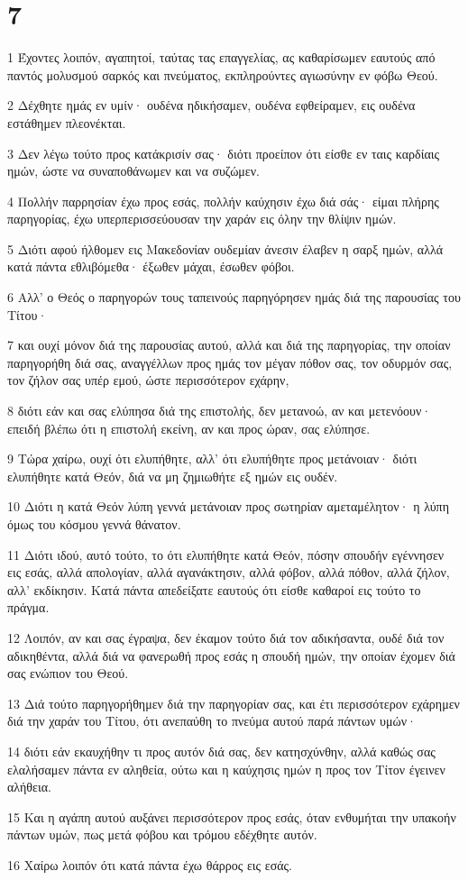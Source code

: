 \chapter{7}

\par 1 Έχοντες λοιπόν, αγαπητοί, ταύτας τας επαγγελίας, ας καθαρίσωμεν εαυτούς από παντός μολυσμού σαρκός και πνεύματος, εκπληρούντες αγιωσύνην εν φόβω Θεού.
\par 2 Δέχθητε ημάς εν υμίν· ουδένα ηδικήσαμεν, ουδένα εφθείραμεν, εις ουδένα εστάθημεν πλεονέκται.
\par 3 Δεν λέγω τούτο προς κατάκρισίν σας· διότι προείπον ότι είσθε εν ταις καρδίαις ημών, ώστε να συναποθάνωμεν και να συζώμεν.
\par 4 Πολλήν παρρησίαν έχω προς εσάς, πολλήν καύχησιν έχω διά σάς· είμαι πλήρης παρηγορίας, έχω υπερπερισσεύουσαν την χαράν εις όλην την θλίψιν ημών.
\par 5 Διότι αφού ήλθομεν εις Μακεδονίαν ουδεμίαν άνεσιν έλαβεν η σαρξ ημών, αλλά κατά πάντα εθλιβόμεθα· έξωθεν μάχαι, έσωθεν φόβοι.
\par 6 Αλλ' ο Θεός ο παρηγορών τους ταπεινούς παρηγόρησεν ημάς διά της παρουσίας του Τίτου·
\par 7 και ουχί μόνον διά της παρουσίας αυτού, αλλά και διά της παρηγορίας, την οποίαν παρηγορήθη διά σας, αναγγέλλων προς ημάς τον μέγαν πόθον σας, τον οδυρμόν σας, τον ζήλον σας υπέρ εμού, ώστε περισσότερον εχάρην,
\par 8 διότι εάν και σας ελύπησα διά της επιστολής, δεν μετανοώ, αν και μετενόουν· επειδή βλέπω ότι η επιστολή εκείνη, αν και προς ώραν, σας ελύπησε.
\par 9 Τώρα χαίρω, ουχί ότι ελυπήθητε, αλλ' ότι ελυπήθητε προς μετάνοιαν· διότι ελυπήθητε κατά Θεόν, διά να μη ζημιωθήτε εξ ημών εις ουδέν.
\par 10 Διότι η κατά Θεόν λύπη γεννά μετάνοιαν προς σωτηρίαν αμεταμέλητον· η λύπη όμως του κόσμου γεννά θάνατον.
\par 11 Διότι ιδού, αυτό τούτο, το ότι ελυπήθητε κατά Θεόν, πόσην σπουδήν εγέννησεν εις εσάς, αλλά απολογίαν, αλλά αγανάκτησιν, αλλά φόβον, αλλά πόθον, αλλά ζήλον, αλλ' εκδίκησιν. Κατά πάντα απεδείξατε εαυτούς ότι είσθε καθαροί εις τούτο το πράγμα.
\par 12 Λοιπόν, αν και σας έγραψα, δεν έκαμον τούτο διά τον αδικήσαντα, ουδέ διά τον αδικηθέντα, αλλά διά να φανερωθή προς εσάς η σπουδή ημών, την οποίαν έχομεν διά σας ενώπιον του Θεού.
\par 13 Διά τούτο παρηγορήθημεν διά την παρηγορίαν σας, και έτι περισσότερον εχάρημεν διά την χαράν του Τίτου, ότι ανεπαύθη το πνεύμα αυτού παρά πάντων υμών·
\par 14 διότι εάν εκαυχήθην τι προς αυτόν διά σας, δεν κατησχύνθην, αλλά καθώς σας ελαλήσαμεν πάντα εν αληθεία, ούτω και η καύχησις ημών η προς τον Τίτον έγεινεν αλήθεια.
\par 15 Και η αγάπη αυτού αυξάνει περισσότερον προς εσάς, όταν ενθυμήται την υπακοήν πάντων υμών, πως μετά φόβου και τρόμου εδέχθητε αυτόν.
\par 16 Χαίρω λοιπόν ότι κατά πάντα έχω θάρρος εις εσάς.

